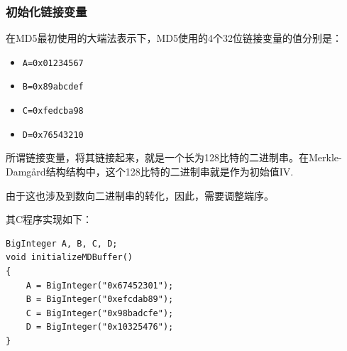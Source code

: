 \subsubsection{初始化链接变量}
在MD5最初使用的大端法表示下，MD5使用的4个32位链接变量的值分别是：
\begin{itemize}
	\item \verb`A=0x01234567`
	\item \verb`B=0x89abcdef`
	\item \verb`C=0xfedcba98`
	\item \verb`D=0x76543210`
\end{itemize}

所谓链接变量，将其链接起来，就是一个长为128比特的二进制串。在Merkle-Damg\aa rd结构结构中，这个128比特的二进制串就是作为初始值$\mathrm{IV}$.\par
由于这也涉及到数向二进制串的转化，因此，需要调整端序。\par
其C程序实现如下：
\begin{prove}
\begin{verbatim}
BigInteger A, B, C, D;
void initializeMDBuffer()
{
    A = BigInteger("0x67452301");
    B = BigInteger("0xefcdab89");
    C = BigInteger("0x98badcfe");
    D = BigInteger("0x10325476");
}
\end{verbatim}
\end{prove}
